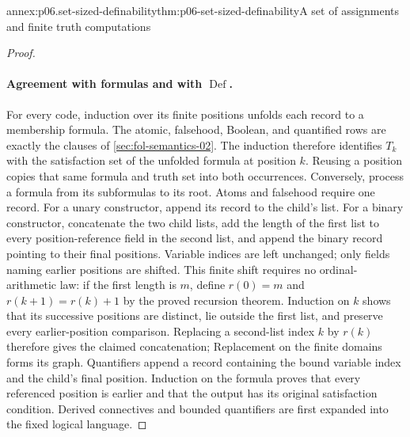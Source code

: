 \begin{annexitem}{annex:p06.set-sized-definability}{thm:p06-set-sized-definability}{A set of assignments and finite truth computations}
\begin{proof}
\paragraph{Agreement with formulas and with \(\operatorname{Def}\).}
For every code, induction over its finite positions unfolds each
record to a membership formula.  The atomic, falsehood, Boolean,
and quantified rows are exactly the clauses of
\cref{sec:fol-semantics-02}.  The induction therefore identifies
\(T_k\) with the satisfaction set of the unfolded formula at
position \(k\).  Reusing a position copies that same formula
and truth set into both occurrences.
Conversely, process a formula from its subformulas to its root.
Atoms and falsehood require one record.  For a unary constructor,
append its record to the child's list.  For a binary constructor,
concatenate the two child lists, add the length of the first list
to every position-reference field in the second list, and append
the binary record pointing to their final positions.  Variable
indices are left unchanged; only fields naming earlier positions
are shifted.  This finite shift requires no ordinal-arithmetic law:
if the first length is \(m\), define \(r(0)=m\) and
\(r(k+1)=r(k)+1\) by the proved recursion theorem.  Induction on
\(k\) shows that its successive positions are distinct, lie
outside the first list, and preserve every earlier-position
comparison.  Replacing a second-list index \(k\) by \(r(k)\)
therefore gives the claimed concatenation; Replacement on the
finite domains forms its graph.  Quantifiers append a record
containing the bound variable index and the child's final position.
Induction on the
formula proves that every referenced position is earlier and that
the output has its original satisfaction condition.  Derived
connectives and bounded quantifiers are first expanded into the
fixed logical language.


\end{proof}
\end{annexitem}
